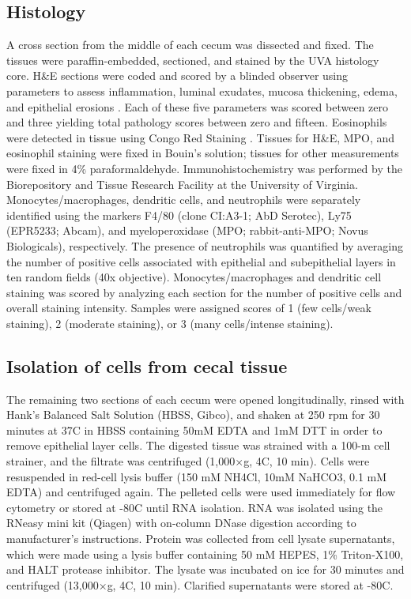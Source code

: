 \subsection{ Histology }
\label{ini:methods:histology}
A cross section from the middle of each cecum was dissected and fixed. 
The tissues were paraffin-embedded, sectioned, and stained by the UVA 
histology core. H\&{}E sections were coded and scored by a blinded observer 
using parameters to assess inflammation, luminal exudates, mucosa thickening, 
edema, and epithelial erosions \cite{Pawlowski:2010il}. Each of these five 
parameters was scored between zero and three yielding 
total pathology scores between zero and fifteen. Eosinophils were 
detected in tissue using Congo Red Staining \cite{Albert:2011jy}. 
Tissues for H\&{}E, MPO, and eosinophil staining were fixed in 
Bouin's solution; tissues for other measurements were fixed in 4\% 
paraformaldehyde. Immunohistochemistry was performed by the 
Biorepository and Tissue Research Facility at the University of 
Virginia. Monocytes/macrophages, dendritic cells, and neutrophils 
were separately identified using the markers F4/80 (clone CI:A3-1; 
AbD Serotec), Ly75 (EPR5233; Abcam), and myeloperoxidase (MPO; 
rabbit-anti-MPO; Novus Biologicals), respectively. The presence 
of neutrophils was quantified by averaging the number of positive 
cells associated with epithelial and subepithelial layers in ten 
random fields (40x objective). Monocytes/macrophages and dendritic 
cell staining was scored by analyzing each section for the number 
of positive cells and overall staining intensity.  Samples were 
assigned scores of 1 (few cells/weak staining), 2 (moderate staining), 
or 3 (many cells/intense staining). 

\subsection{ Isolation of cells from cecal tissue }
The remaining two sections of each cecum were opened longitudinally, rinsed 
with Hank's Balanced Salt Solution (HBSS, Gibco), and shaken at 250 rpm for 
30 minutes at 37\textdegree{}C in HBSS containing 50mM EDTA and 1mM DTT 
in order to remove epithelial layer cells. The digested tissue was strained 
with  a 100-\textmugreek{}m cell strainer, and the filtrate was centrifuged 
(1,000$\times$g, 4\textdegree{}C, 10 min). Cells were resuspended in 
red-cell lysis buffer (150 mM NH4Cl, 10mM NaHCO3, 0.1 mM EDTA) and 
centrifuged again. The pelleted cells were used immediately for flow 
cytometry or stored at -80\textdegree{}C until RNA isolation. RNA was 
isolated using the RNeasy mini kit (Qiagen) with on-column DNase 
digestion according to manufacturer's instructions. Protein was collected 
from cell lysate supernatants, which were made using a lysis buffer 
containing 50 mM HEPES, 1\% Triton-X100, and HALT protease inhibitor. 
The lysate was incubated on ice for 30 minutes and centrifuged 
(13,000$\times$g, 4\textdegree{}C, 10 min). Clarified supernatants 
were stored at -80\textdegree{}C.

